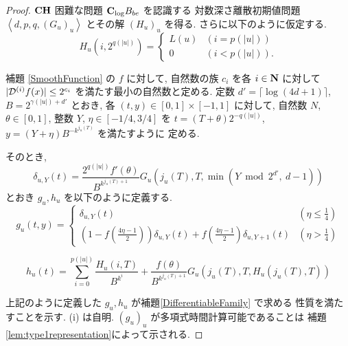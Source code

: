  \begin{proof}
  $\mathbf{CH}$ 困難な問題 $\mathbf{C}_{\log} B_{be}$ を認識する
  対数深さ離散初期値問題 $\left< d, p, q,(G_u)_u \right>$
  とその解 $(H_u)_u$ を得る. さらに以下のように仮定する.
  \begin{equation}
   H_u(i, 2^{q(|u|)}) = \begin{cases}
			L(u) & (i=p(|u|)) \\
			0 & (i<p(|u|)).
			\end{cases}
  \end{equation}

  補題 \ref{SmoothFunction} の $f$ に対して, 
  自然数の族 $c_i$ を各 $i \in \mathbf N$ に対して 
  $|\mathcal D^{(i)}f(x)| \le 2^{c_i}$ を満たす最小の自然数と定める.
 定数 $d' = \lceil \log (4d + 1) \rceil$, 
 $B = 2^{\gamma(|u|) + d'}$ とおき, 
 各 $(t, y) \in [0,1] \times [-1, 1]$ に対して,
 自然数 $N$, $\theta \in [0,1]$, 整数 $Y$, $\eta \in [-1/4, 3/4]$ を
 $t = (T + \theta)2^{-q(|u|)}$, $y = (Y + \eta)B^{-k^{j_u(T)}}$ を満たすように
 定める.
 
 そのとき,
 \begin{equation}
  \delta_{u, Y} (t) = \frac{2^{q(|u|)} f'(\theta)}{B^{k^{j_u(T)+1}}} 
   G_u\left( j_u(T), T, \min \left(Y \bmod 2^{d'}\!\!\!,\ d-1 \right) \right)
 \end{equation}
 とおき $g_u, h_u$ を以下のように定義する.
 \begin{equation}
  g_u(t,y) 
  = \begin{cases}
     \delta_{u, Y}(t)
     & (\eta \le \frac 1 4)
     \\
     ( 1-f ( \frac{4\eta-1}{2})) \delta_{u, Y}(t) 
     + f ( \frac{4\eta-1}{2}) \delta_{u,Y+1}(t)
     & (\eta > \frac 1 4)
    \end{cases}
 \end{equation}

 \begin{equation} 
  h_u(t) = \sum^{p(|u|)}_{i=0} \frac{H_u(i, T)}{B^{k^i}}  
  + \frac{f(\theta)}{B^{k^{j_u(T)+1}}} G_u(j_u(T), T, H_u(j_u(T), T)) 
  \label{eq:hu}
 \end{equation}

 上記のように定義した $g_u, h_u$ が補題\ref{DifferentiableFamily} で求める
 性質を満たすことを示す. (i) は自明. 
 $(g_u)_u$ が多項式時間計算可能であることは
  補題 \ref{lem:type1representation}によって示される.


\end{proof}
